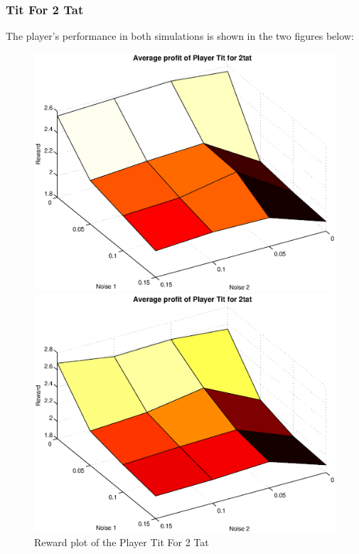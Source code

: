 \documentclass[11pt,twoside]{article}
\begin{document}
\newpage
\subsubsection{Tit For 2 Tat}
The player's performance in both simulations is shown in the two figures below:
\begin{figure}[h]

\begin{minipage}[hbt]{0.65\textwidth}
	\centering
	\includegraphics[width=\textwidth]{pics/simulation1/Reward_vs_Noise_of_Player_Tit_for_2tat}
\end{minipage}
\hfill
\begin{minipage}[hbt]{0.3\textwidth}
	\centering
	\includegraphics[width=\textwidth]{pics/simulation2/Reward_vs_Noise_of_Player_Tit_for_2tat}
\end{minipage}
	\caption{Reward plot of the Player Tit For 2 Tat}
	\label{pic player tf2t}
\end{figure}
\end{document}
